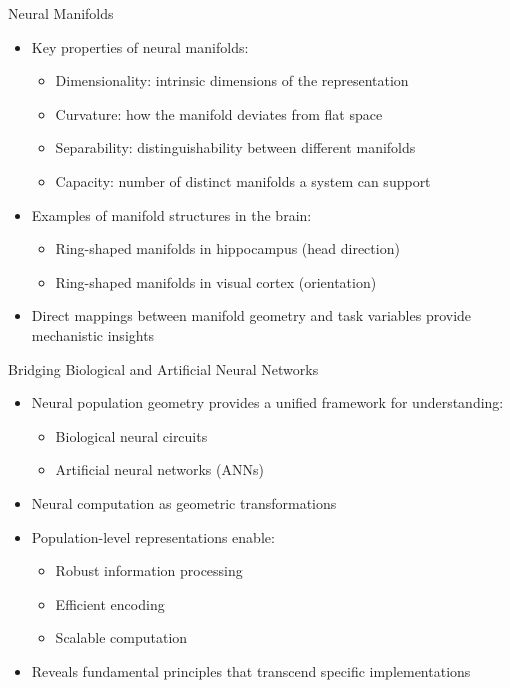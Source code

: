 \documentclass[aspectratio=169]{beamer}
\begin{document}
\begin{frame}{Neural Manifolds}
    \begin{itemize}
        \item Key properties of neural manifolds:
        \begin{itemize}
            \item Dimensionality: intrinsic dimensions of the representation
            \item Curvature: how the manifold deviates from flat space
            \item Separability: distinguishability between different manifolds
            \item Capacity: number of distinct manifolds a system can support
        \end{itemize}
        \item Examples of manifold structures in the brain:
        \begin{itemize}
            \item Ring-shaped manifolds in hippocampus (head direction)
            \item Ring-shaped manifolds in visual cortex (orientation)
        \end{itemize}
        \item Direct mappings between manifold geometry and task variables provide mechanistic insights
    \end{itemize}
\end{frame}

\begin{frame}{Bridging Biological and Artificial Neural Networks}
    \begin{itemize}
        \item Neural population geometry provides a unified framework for understanding:
        \begin{itemize}
            \item Biological neural circuits
            \item Artificial neural networks (ANNs)
        \end{itemize}
        \item Neural computation as geometric transformations
        \item Population-level representations enable:
        \begin{itemize}
            \item Robust information processing
            \item Efficient encoding
            \item Scalable computation
        \end{itemize}
        \item Reveals fundamental principles that transcend specific implementations
    \end{itemize}
\end{frame}
\end{document}
